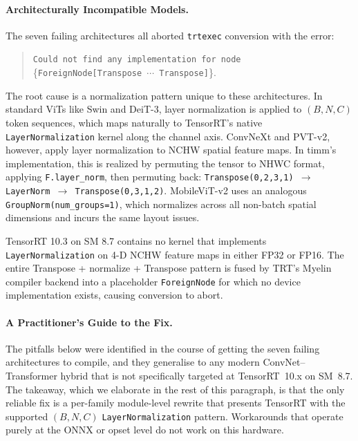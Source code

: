 \documentclass[runningheads,a4paper]{llncs}
\begin{document}
\begin{table}[!htbp]
\centering
\caption{Unified native TensorRT inference latency on the Jetson Orin Nano (batch size 1, $96\times96$ input, MAXN\_SUPER, locked clocks). All sixteen baseline architectures execute as native TRT engines after applying the per-family rewrites of Section~\ref{sec:trt-compat-success} where required.}
\label{tab:jetson-latency-full}
\footnotesize

\end{table}

\paragraph{Architecturally Incompatible Models.}
The seven failing architectures all aborted \texttt{trtexec} conversion with the error:

\begin{quote}
\texttt{Could not find any implementation for node}\\
\{\texttt{ForeignNode[Transpose $\cdots$ Transpose]}\}.
\end{quote}

The root cause is a normalization pattern unique to these architectures. In standard ViTs like Swin and DeiT-3, layer normalization is applied to $(B,N,C)$ token sequences, which maps naturally to TensorRT's native \texttt{LayerNormalization} kernel along the channel axis. ConvNeXt and PVT-v2, however, apply layer normalization to NCHW spatial feature maps. In timm's implementation, this is realized by permuting the tensor to NHWC format, applying \texttt{F.layer\_norm}, then permuting back: \texttt{Transpose(0,2,3,1) $\rightarrow$ LayerNorm $\rightarrow$ Transpose(0,3,1,2)}. MobileViT-v2 uses an analogous \texttt{GroupNorm(num\_groups=1)}, which normalizes across all non-batch spatial dimensions and incurs the same layout issues.

TensorRT 10.3 on SM 8.7 contains no kernel that implements \texttt{LayerNormalization} on 4-D NCHW feature maps in either FP32 or FP16. The entire Transpose + normalize + Transpose pattern is fused by TRT's Myelin compiler backend into a placeholder \texttt{ForeignNode} for which no device implementation exists, causing conversion to abort.

\paragraph{A Practitioner's Guide to the Fix.}\label{sec:trt-compat-success}
The pitfalls below were identified in the course of getting the seven failing architectures to compile, and they generalise to any modern ConvNet--Transformer hybrid that is not specifically targeted at TensorRT~10.x on SM~8.7. The takeaway, which we elaborate in the rest of this paragraph, is that the only reliable fix is a per-family module-level rewrite that presents TensorRT with the supported $(B,N,C)$ \texttt{LayerNormalization} pattern. Workarounds that operate purely at the ONNX or opset level do not work on this hardware.
\end{document}

